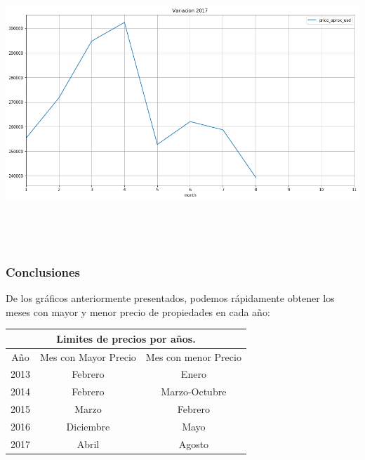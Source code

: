 \documentclass[a4paper, 10pt]{article}
\begin{document}
        \begin{center}
       				\includegraphics[width=6in, height=4.2in]{images/variacion2017}
		   	\end{center}

      \subsubsection{Conclusiones}

      De los gráficos anteriormente presentados, podemos rápidamente obtener los meses con mayor y menor precio de propiedades en cada año:

      \begin{center}
        \begin{tabular}{ |c|c|c| }
          \hline
          \multicolumn{3}{|c|}{Limites de precios por años.}\\
          \hline
          \hline
          Año & Mes con Mayor Precio & Mes con menor Precio \\
          \hline
          2013 & Febrero & Enero \\
          2014 & Febrero & Marzo-Octubre \\
          2015 & Marzo & Febrero \\
          2016 & Diciembre & Mayo \\
          2017 & Abril & Agosto \\

          \hline
        \end{tabular}
      \end{center}
\end{document}
